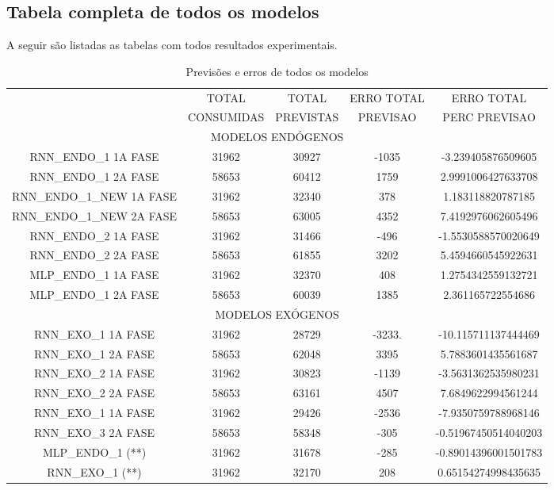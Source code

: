 \documentclass[	12pt, Times, openright, twoside, a4paper, english, brazil]{abntex2}
\begin{document}
                
        \subsection{Tabela completa de todos os modelos}
            A seguir são listadas as tabelas com todos resultados experimentais.
     
        \begin{table}[!ht]
        \caption{Previsões e erros de todos os modelos}
        \begin{adjustbox}{width=\columnwidth,center}
           \begin{tabular}{ | c | c| c | c| c | }
     \rowcolor{gray!50}
    \multirow{2}{*}{	MODELO} & TOTAL  & TOTAL  & ERRO TOTAL & ERRO TOTAL  \\ \rowcolor{gray!50}
   &                        CONSUMIDAS & PREVISTAS &  PREVISAO &  PERC PREVISAO  \\ 
    \multicolumn{5}{c}{	MODELOS ENDÓGENOS }  \\ \hline
	RNN\_ENDO\_1 1A FASE & 31962 & 30927 & -1035 & -3.239405876509605 \\ \hline
	RNN\_ENDO\_1 2A FASE & 58653 & 60412 & 1759 & 2.9991006427633708 \\ \hline
	RNN\_ENDO\_1\_NEW 1A FASE & 31962 & 32340 & 378 & 1.183118820787185 \\ \hline
	RNN\_ENDO\_1\_NEW 2A FASE & 58653 & 63005& 4352 & 7.4192976062605496 \\ \hline
	RNN\_ENDO\_2 1A FASE & 31962 & 31466 & -496 & -1.5530588570020649 \\ \hline
	RNN\_ENDO\_2 2A FASE & 58653 & 61855 & 3202 & 5.4594660545922631 \\ \hline
	MLP\_ENDO\_1 1A FASE & 31962 & 32370 & 408 & 1.2754342559132721 \\ \hline
	MLP\_ENDO\_1 2A FASE & 58653 & 60039 & 1385 & 2.361165722554686 \\ \hline
	\multicolumn{5}{c}{ MODELOS EXÓGENOS }\\ \hline
	RNN\_EXO\_1 1A FASE & 31962 & 28729 & -3233. & -10.115711137444469 \\ \hline
	RNN\_EXO\_1 2A FASE & 58653 & 62048 & 3395 & 5.7883601435561687 \\ \hline
	RNN\_EXO\_2 1A FASE & 31962 & 30823 & -1139& -3.5631362535980231 \\ \hline
	RNN\_EXO\_2 2A FASE & 58653 & 63161 & 4507 & 7.6849622994561244 \\ \hline
	RNN\_EXO\_1 1A FASE & 31962 & 29426 & -2536 & -7.9350759788968146 \\ \hline
	RNN\_EXO\_3 2A FASE & 58653 & 58348 & -305 & -0.51967450514040203 \\ \hline
	MLP\_ENDO\_1 (**) & 31962 & 31678 & -285 & -0.89014396001501783 \\ \hline
	RNN\_EXO\_1 (**) & 31962 & 32170 & 208 & 0.65154274998435635 \\ \hline
\end{tabular} \end{adjustbox} \end{table} 
\end{document}
